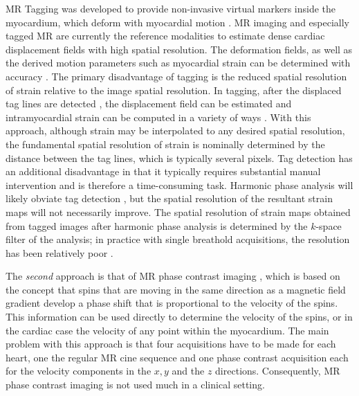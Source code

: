 MR Tagging was developed to provide non-invasive virtual markers inside the myocardium, which deform with myocardial motion \cite{mrtag}. MR imaging and especially tagged MR are currently the reference modalities to estimate dense cardiac displacement fields with high spatial resolution. The deformation fields, as well as the derived motion parameters such as myocardial strain can be determined with accuracy \cite{Shi99}\cite{mrtag1}\cite{chenBook}. The primary disadvantage of tagging is the reduced spatial resolution of strain relative to the image spatial resolution. In tagging, after the displaced tag lines are detected \cite{guttman94}, the displacement field can be estimated and intramyocardial strain can be computed in a variety of ways \cite{mrtag}. With this approach, although strain may be interpolated to any desired spatial resolution, the fundamental spatial resolution of strain is nominally determined by the distance between the tag lines, which is typically several pixels. Tag detection has an additional disadvantage in that it typically requires substantial manual intervention and is therefore a time-consuming task. Harmonic phase analysis will likely obviate tag detection \cite{mrtag1}, but the spatial resolution of the resultant strain maps will not necessarily improve. The spatial resolution of strain maps obtained from tagged images after harmonic phase analysis is determined by the $k$-space filter of the analysis; in practice with single breathold acquisitions, the resolution has been relatively poor \cite{garot00}.  

The {\em second} approach is that of MR phase contrast imaging \cite{mrphase}, which is based on the concept that spins that are moving in the same direction as a magnetic field gradient develop a phase shift that is proportional to the velocity of the spins. This information can be used directly to determine the velocity of the spins, or in the cardiac case the velocity of any point within the myocardium. The main problem with this approach is that four acquisitions have to be made for each heart, one the regular MR cine sequence and one phase contrast acquisition each for the velocity components in the $x, y$ and the $z$ directions. 
Consequently, MR phase contrast imaging is not used much in a clinical setting. 


